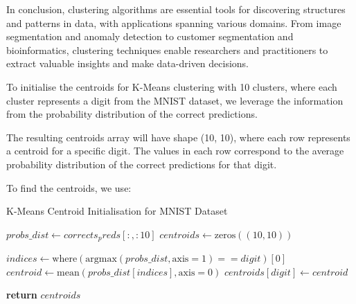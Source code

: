 In conclusion, clustering algorithms are essential tools for discovering structures and patterns in data, with applications spanning various domains. From image segmentation and anomaly detection to customer segmentation and bioinformatics, clustering techniques enable researchers and practitioners to extract valuable insights and make data-driven decisions.

To initialise the centroids for K-Means clustering with 10 clusters, where each cluster represents a digit from the MNIST dataset, we leverage the information from the probability distribution of the correct predictions.

The resulting centroids array will have shape (10, 10), where each row represents a centroid for a specific digit. The values in each row correspond to the average probability distribution of the correct predictions for that digit.

To find the centroids, we use:

\begin{algorithm}
\caption{K-Means Centroid Initialisation for MNIST Dataset}
\begin{algorithmic}[1]

\State $probs\_dist \gets corrects_preds[:, :10]$ 
\State $centroids \gets \text{zeros}((10, 10))$ 

\State $indices \gets \text{where}(\text{argmax}(probs\_dist, \text{axis}=1) == digit)[0]$ 
\State $centroid \gets \text{mean}(probs\_dist[indices], \text{axis}=0)$ 
\State $centroids[digit] \gets centroid$ 
\EndFor

\State \textbf{return} $centroids$
\end{algorithmic}
\end{algorithm}

